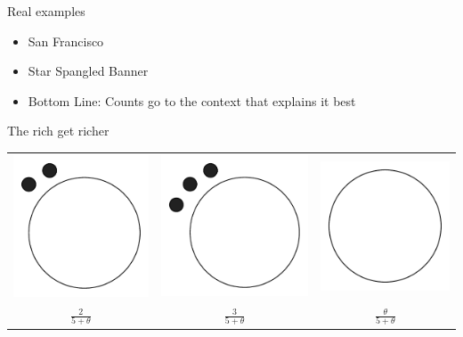\documentclass[compress]{beamer}
\begin{document}
\begin{frame}{Real examples}

	\begin{itemize}
		\item San Francisco
		\pause
		\item Star Spangled Banner
		\pause
		\item Bottom Line: Counts go to the context that explains it best
	\end{itemize}

\end{frame}


\begin{frame}{The rich get richer}

	\begin{center}
	\begin{tabular}{ccc}
	\includegraphics[width=.2\linewidth]{lm/table_2} &
	\includegraphics[width=.2\linewidth]{lm/table_3} &
	\includegraphics[width=.2\linewidth]{lm/table_0} \\
	 $\frac{2}{5+\theta}$ & $\frac{3}{5 + \theta}$ & $\frac{\theta}{5+\theta}$ \\
	\end{tabular}
	\end{center}


\end{frame}
\end{document}
